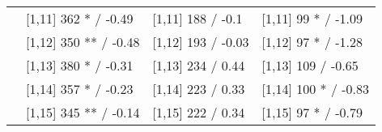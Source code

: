 \begin{table}
\begin{tabular}[t]{llll}
 & {}[1,11] 362 * / -0.49 & {}[1,11] 188  / -0.1 & {}[1,11] 99 * / -1.09\\
 & {}[1,12] 350 ** / -0.48 & {}[1,12] 193  / -0.03 & {}[1,12] 97 * / -1.28\\
\addlinespace
 & {}[1,13] 380 * / -0.31 & {}[1,13] 234  / 0.44 & {}[1,13] 109  / -0.65\\
 & {}[1,14] 357 * / -0.23 & {}[1,14] 223  / 0.33 & {}[1,14] 100 * / -0.83\\
 & {}[1,15] 345 ** / -0.14 & {}[1,15] 222  / 0.34 & {}[1,15] 97 * / -0.79\\
\bottomrule
\end{tabular}
\end{table}
